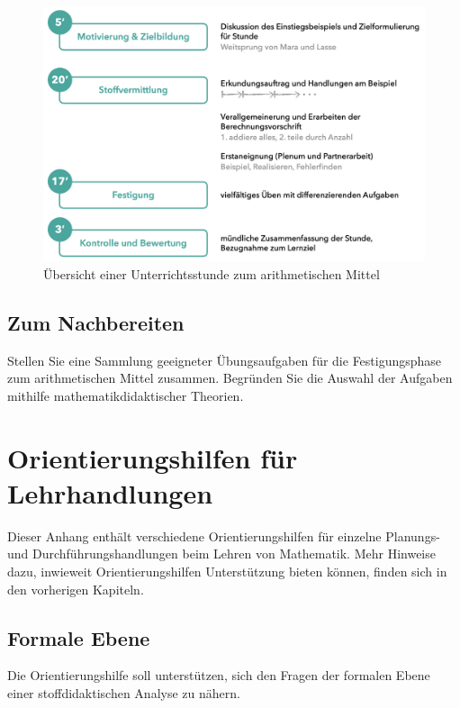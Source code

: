 \documentclass[
]{scrbook}
\theoremstyle{definition}
\theoremstyle{definition}
\theoremstyle{definition}
\theoremstyle{definition}
\theoremstyle{remark}
\begin{document}
\begin{figure}

{\centering \includegraphics[width=0.9\linewidth]{pictures/B-Uebersicht} 

}

\caption{Übersicht einer Unterrichtsstunde zum arithmetischen Mittel}\label{fig:Uebersicht}
\end{figure}

\section{Zum Nachbereiten}\label{beispiel-arithmetisches-mitttel-nachbereitung}

Stellen Sie eine Sammlung geeigneter Übungsaufgaben für die Festigungsphase zum arithmetischen Mittel zusammen. Begründen Sie die Auswahl der Aufgaben mithilfe mathematikdidaktischer Theorien.

\chapter{Orientierungshilfen für Lehrhandlungen}\label{orientierungshilfen-fuxfcr-lehrhandlungen}

Dieser Anhang enthält verschiedene Orientierungshilfen für einzelne Planungs- und Durchführungshandlungen beim Lehren von Mathematik. Mehr Hinweise dazu, inwieweit Orientierungshilfen Unterstützung bieten können, finden sich in den vorherigen Kapiteln.

\section{Formale Ebene}\label{orientierungshilfe-formale-ebene}

Die Orientierungshilfe soll unterstützen, sich den Fragen der formalen Ebene einer stoffdidaktischen Analyse zu nähern.
\end{document}
